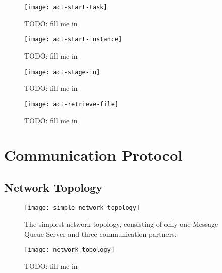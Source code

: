 \begin{figure}
  \begin{center}
    \texttt{[image: act-start-task]}
  \end{center}
  \caption[Start Task Activity]{TODO: fill me in}
  \label{fig:act-start-task}
\end{figure}

\begin{figure}
  \begin{center}
    \texttt{[image: act-start-instance]}
  \end{center}
  \caption[Start Instance Activity]{TODO: fill me in}
  \label{fig:act-start-instance}
\end{figure}

\begin{figure}
  \begin{center}
    \texttt{[image: act-stage-in]}
  \end{center}
  \caption[Stage-In Activity]{TODO: fill me in}
  \label{fig:act-stage-in}
\end{figure}

\begin{figure}
  \begin{center}
    \texttt{[image: act-retrieve-file]}
  \end{center}
  \caption[File Retrieval Activity]{TODO: fill me in}
  \label{fig:act-retrieve-file}
\end{figure}


\section{Communication Protocol}
\label{cha:comm-prot}

\subsection{Network Topology}
\label{sec:network-topology}

\begin{figure}
  \begin{center}
    \texttt{[image: simple-network-topology]}
  \end{center}
  \caption[Network  Topology   (simple)]{The  simplest  network  topology,
    consisting of  only one Message  Queue Server and  three communication
    partners.}
  \label{fig:simple-net-top}
\end{figure}

\begin{figure}
  \begin{center}
    \texttt{[image: network-topology]}
  \end{center}
  \caption[Network  Topology]{TODO: fill me in}
  \label{fig:net-top}
\end{figure}

